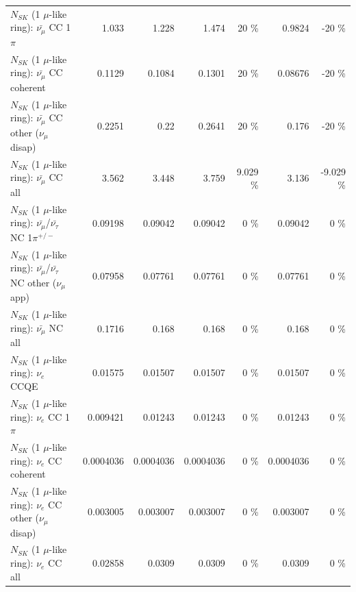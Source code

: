 \begin{table}
\begin{tabular}{| l | r | r | r  r | r  r |}
                         $N_{SK}$ (1 $\mu$-like ring): $\bar{\nu_\mu}$ CC 1$\pi$ &           1.033 &           1.228 &           1.474 &       20 \%  &          0.9824 &      -20 \%  \\ 
                       $N_{SK}$ (1 $\mu$-like ring): $\bar{\nu_\mu}$ CC coherent &          0.1129 &          0.1084 &          0.1301 &       20 \%  &         0.08676 &      -20 \%  \\ 
        $N_{SK}$ (1 $\mu$-like ring): $\bar{\nu_\mu}$ CC other ($\nu_\mu$ disap) &          0.2251 &            0.22 &          0.2641 &       20 \%  &           0.176 &      -20 \%  \\ 
                          $N_{SK}$ (1 $\mu$-like ring): $\bar{\nu_{\mu}}$ CC all &           3.562 &           3.448 &           3.759 &    9.029 \%  &           3.136 &   -9.029 \%  \\ 
\hline
  $N_{SK}$ (1 $\mu$-like ring): $\bar{\nu_\mu}$/$\bar{\nu_\tau}$ NC 1$\pi^{+/-}$ &         0.09198 &         0.09042 &         0.09042 &        0 \%  &         0.09042 &        0 \%  \\ 
$N_{SK}$ (1 $\mu$-like ring): $\bar{\nu_\mu}$/$\bar{\nu_\tau}$ NC other ($\nu_\mu$ app) &         0.07958 &         0.07761 &         0.07761 &        0 \%  &         0.07761 &        0 \%  \\ 
                          $N_{SK}$ (1 $\mu$-like ring): $\bar{\nu_{\mu}}$ NC all &          0.1716 &           0.168 &           0.168 &        0 \%  &           0.168 &        0 \%  \\ 
\hline
\hline
\hline
                                      $N_{SK}$ (1 $\mu$-like ring): $\nu_e$ CCQE &         0.01575 &         0.01507 &         0.01507 &        0 \%  &         0.01507 &        0 \%  \\ 
                                 $N_{SK}$ (1 $\mu$-like ring): $\nu_e$ CC 1$\pi$ &        0.009421 &         0.01243 &         0.01243 &        0 \%  &         0.01243 &        0 \%  \\ 
                               $N_{SK}$ (1 $\mu$-like ring): $\nu_e$ CC coherent &       0.0004036 &       0.0004036 &       0.0004036 &        0 \%  &       0.0004036 &        0 \%  \\ 
                $N_{SK}$ (1 $\mu$-like ring): $\nu_e$ CC other ($\nu_\mu$ disap) &        0.003005 &        0.003007 &        0.003007 &        0 \%  &        0.003007 &        0 \%  \\ 
                                  $N_{SK}$ (1 $\mu$-like ring): $\nu_{e}$ CC all &         0.02858 &          0.0309 &          0.0309 &        0 \%  &          0.0309 &        0 \%  \\ 

\end{tabular}
\end{table}
